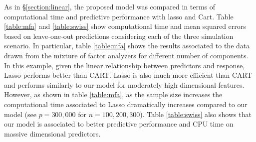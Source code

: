 \documentclass{article} %
\begin{document}
As in \S \ref{section:linear}, the proposed model was compared in terms of computational time and predictive performance with lasso and Cart. Table \ref{table:mfa} and \ref{table:swiss}  show computational time and mean squared errors based on leave-one-out predictions considering each of the three simulation scenario.  In particular, table \ref{table:mfa} shows the results associated to the data drawn from the mixture of factor analyzers for different number of components. In this example, given the linear relationship between predictors and response, Lasso performs better than CART. Lasso is also much more efficient than CART and performs similarly to our model for moderately high dimensional features. However, as shown in table \ref{table:mfa}, as the sample size increases the computational time associated to Lasso dramatically increases compared to our model (see $p=300,000$ for $n=100, 200, 300$). Table \ref{table:swiss} also shows that our model is associated to better predictive performance and CPU time on massive dimensional predictors.
\end{document}
